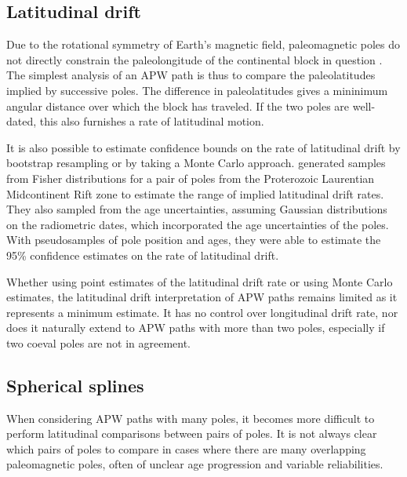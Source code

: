 \documentclass[preprint,12pt,authoryear]{elsarticle}
\begin{document}
\subsection{Latitudinal drift}
\label{sec:latitudinal_drift}
Due to the rotational symmetry of Earth's magnetic field, paleomagnetic poles do not
directly constrain the paleolongitude of the continental block in question \citep{butler1992paleomagnetism}.
The simplest analysis of an APW path is thus to compare the paleolatitudes implied by successive poles.
The difference in paleolatitudes gives a mininimum angular distance over which the block has traveled. 
If the two poles are well-dated, this also furnishes a rate of latitudinal motion.

It is also possible to estimate confidence bounds on the rate of latitudinal drift by
bootstrap resampling \citep[e.g.][]{tarduno1990fast} or by taking a Monte Carlo approach. 
\citet{swanson2014confirmation} generated samples from Fisher distributions
for a pair of poles from the Proterozoic Laurentian Midcontinent Rift zone to estimate the range
of implied latitudinal drift rates. They also sampled from the age uncertainties, assuming
Gaussian distributions on the radiometric dates, which incorporated the age uncertainties of the poles.
With pseudosamples of pole position and ages, they were able to estimate the 95\% 
confidence estimates on the rate of latitudinal drift.

Whether using point estimates of the latitudinal drift rate or using Monte Carlo estimates, 
the latitudinal drift interpretation of APW paths remains limited as it represents a minimum estimate.
It has no control over longitudinal drift rate, 
nor does it naturally extend to APW paths with more than two poles, 
especially if two coeval poles are not in agreement.

\subsection{Spherical splines}
\label{sec:spherical_splines}
When considering APW paths with many poles, it becomes more difficult to perform
latitudinal comparisons between pairs of poles. It is not always clear which pairs of
poles to compare in cases where there are many overlapping paleomagnetic poles,
often of unclear age progression and variable reliabilities.
\end{document}
